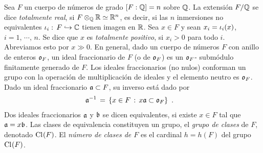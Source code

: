 %
%
Sea $F$ un cuerpo de n\'{u}meros de grado $[F:\bb{Q}]=n$ sobre $\bb{Q}$. La
extensi\'{o}n $F/\bb{Q}$ se dice \emph{totalmente real}, si
$F\otimes_{\bb{Q}}\bb{R}\simeq\bb{R}^{n}$, es decir, si las $n$ inmersiones no
equivalentes $\inc[i]:\,F\hookrightarrow\bb{C}$ tienen imagen en $\bb{R}$. Sea
$x\in F$ y sean $x_{i}=\inc[i](x)$, $i=1,\,\cdots,\,n$. Se dice que $x$ es
\emph{totalmente positivo}, si $x_{i}>0$ para todo $i$. Abreviamos esto por
$x\gg 0$. En general, dado un cuerpo de n\'{u}meros $F$ con anillo de enteros
$\oka{F}$, un ideal fraccionario de $F$ (o de $\oka{F}$) es un $\oka{F}$-%
subm\'{o}dulo finitamente generado de $F$. Los ideales fraccionarios (no nulos)
conforman un grupo con la operaci\'{o}n de multiplicaci\'{o}n de ideales y el
elemento neutro es $\oka{F}$. Dado un ideal fraccionario $\frak{a}\subset F$,
su inverso est\'{a} dado por
\begin{align*}
	\frak{a}^{-1} & \,=\,\left\lbrace x\in F \,:\, x\frak{a}\subset
		\oka{F}\right\rbrace
	\text{ .}
\end{align*}
%
Dos ideales fraccionarios $\frak{a}$ y $\frak{b}$ se dicen equivalentes, si
existe $x\in F$ tal que $\frak{a}=x\frak{b}$. Las clases de equivalencia
constituyen un grupo, el \emph{grupo de clases} de $F$, denotado $\Class{F}$.
El \emph{n\'{u}mero de clases de $F$} es el cardinal $h=h(F)$ del grupo
$\Class{F}$.

